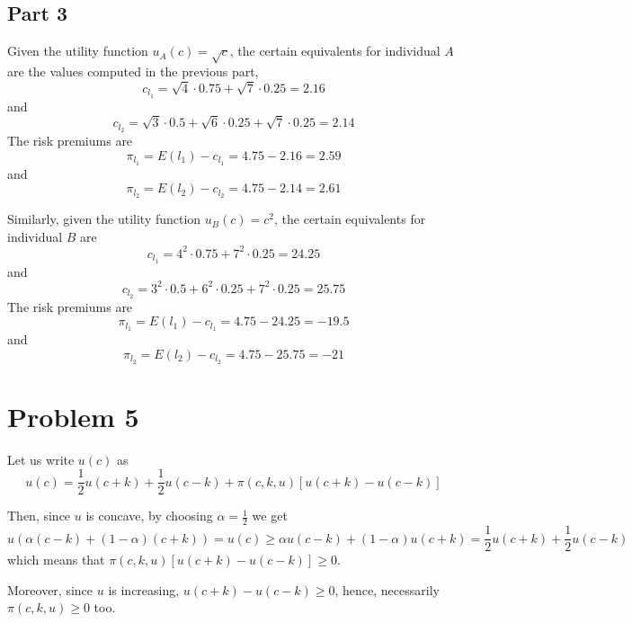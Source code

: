 \documentclass[12pt]{extarticle}
\numberwithin{table}{section}
\numberwithin{figure}{section}
\numberwithin{equation}{section}
\begin{document}
\subsection*{Part 3}
Given the utility function $u_A(c) = \sqrt c$,
the certain equivalents for individual $A$ are the values computed in the previous part,
\begin{equation}
    c_{l_1} = \sqrt4 \cdot 0.75 + \sqrt7 \cdot 0.25 = 2.16
\end{equation}
and
\begin{equation}
    c_{l_2} = \sqrt3 \cdot 0.5 + \sqrt6 \cdot 0.25 + \sqrt7 \cdot 0.25 = 2.14
\end{equation}
The risk premiums are
\begin{equation}
    \pi_{l_1} = E(l_1) - c_{l_1} = 4.75 - 2.16 = 2.59
\end{equation}
and
\begin{equation}
    \pi_{l_2} = E(l_2) - c_{l_2} = 4.75 - 2.14 = 2.61
\end{equation}

Similarly, given the utility function $u_B(c) = c^2$, the certain equivalents for individual $B$ are
\begin{equation}
    c_{l_1} = 4^2 \cdot 0.75 + 7^2 \cdot 0.25 = 24.25
\end{equation}
and
\begin{equation}
    c_{l_2} = 3^2 \cdot 0.5 + 6^2 \cdot 0.25 + 7^2 \cdot 0.25 = 25.75
\end{equation}
The risk premiums are
\begin{equation}
    \pi_{l_1} = E(l_1) - c_{l_1} = 4.75 - 24.25 = -19.5
\end{equation}
and
\begin{equation}
    \pi_{l_2} = E(l_2) - c_{l_2} = 4.75 - 25.75 = -21
\end{equation}

\section*{Problem 5}

Let us write $u(c)$ as
\begin{equation}
    u(c) = \frac{1}{2} u(c + k) + \frac{1}{2} u(c-k) + \pi(c, k, u) [ u(c + k) - u(c-k)]
\end{equation}

Then, since $u$ is concave, by choosing $\alpha = \frac{1}{2}$ we get
\begin{equation}
    u(\alpha (c - k) + (1-\alpha) (c + k)) = u(c) \geq \alpha u(c - k) + (1-\alpha) u(c+k) = \frac{1}{2} u(c + k) + \frac{1}{2} u(c-k)
\end{equation}
which means that $\pi(c, k, u) [ u(c + k) - u(c-k)] \geq 0$.

Moreover, since $u$ is increasing, $u(c + k) - u(c-k) \geq 0$, hence, necessarily $\pi(c, k, u) \geq 0$ too.
\end{document}
